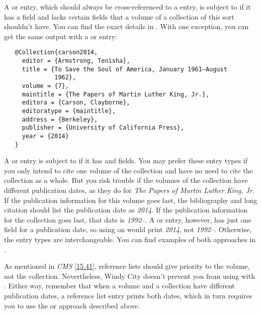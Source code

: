 \documentclass[11pt,letterpaper,oneside]{article}
\begin{document}
A  or  entry, which should always
be cross-referenced to a  entry, is subject to
 if it has a  field and lacks certain
fields that a volume of a collection of this sort shouldn't have. You
can find the exact details in . With one
exception, you can get the same output with a  or
 entry:

\begin{verbatim}
   @Collection{carson2014,
     editor = {Armstrong, Tenisha},
     title = {To Save the Soul of America, January 1961–August
              1962},
     volume = {7},
     maintitle = {The Papers of Martin Luther King, Jr.},
     editora = {Carson, Clayborne},
     editoratype = {maintitle},
     address = {Berkeley},
     publisher = {University of California Press},
     year = {2014}
   }
\end{verbatim}

A  or  entry is subject to
 if it has  and 
fields. You may prefer these entry types if you only intend to cite
one volume of the collection and have no need to cite the collection
as a whole. But you risk trouble if the volumes of the collection have
different publication dates, as they do for \textit{The Papers of
Martin Luther King, Jr}. If the publication information for this
volume goes last, the bibliography and long citation should list the
publication date as \textit{2014}. If the publication information for
the collection goes last, that date is \textit{1992–}. A
 or  entry, however, has just one
field for a publication date, so using  on
 would print \textit{2014}, not \textit{1992–}.
Otherwise, the entry types are interchangeable. You can find examples
of both approaches in .

As mentioned in \textit{CMS} \ref{15.41}, reference lists should give
priority to the volume, not the collection. Nevertheless, Windy City
doesn't prevent you from using  with .
Either way, remember that when a volume and a collection have
different publication dates, a reference list entry prints both dates,
which in turn requires you to use the  or
 approach described above.

\begin{refonly}
\nocite{armstrong2014}
\end{refonly}
\end{document}
